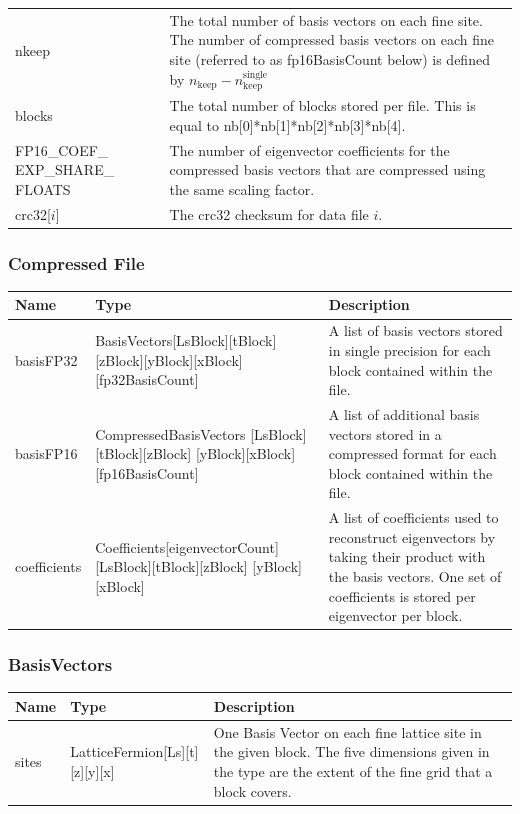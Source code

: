 \documentclass{article}
\begin{document}
\begin{longtable}{p{} |p{} |p{}}
nkeep & & The total number of basis vectors on each fine site. The number of compressed basis vectors on each fine site (referred to as fp16BasisCount below) is defined by $n_\mathrm{keep} - n_\mathrm{keep}^\mathrm{single}$\\
blocks & & The total number of blocks stored per file. This is equal to nb[0]*nb[1]*nb[2]*nb[3]*nb[4].\\
FP16\_COEF\_ EXP\_SHARE\_ FLOATS & & The number of eigenvector coefficients for the compressed basis vectors that are compressed using the same scaling factor.\\
crc32[$i$] & & The crc32 checksum for data file $i$.\\
\hline
\end{longtable}

\subsubsection{Compressed File}
\begin{tabular}{p{} |p{} |p{}}
\hline
Name & Type & Description\\
\hline
basisFP32 & BasisVectors[LsBlock][tBlock] [zBlock][yBlock][xBlock] [fp32BasisCount] & A list of basis vectors stored in single precision for each block contained within the file.\\
basisFP16 & CompressedBasisVectors [LsBlock][tBlock][zBlock] [yBlock][xBlock] [fp16BasisCount] & A list of additional basis vectors stored in a compressed format for each block contained within the file.\\
coefficients & Coefficients[eigenvectorCount]
[LsBlock][tBlock][zBlock] [yBlock][xBlock]  & A list of coefficients used to reconstruct eigenvectors by taking their product with the basis vectors. One set of coefficients is stored per eigenvector per block.\\
\hline
\end{tabular}

\subsubsection{BasisVectors}
\begin{tabular}{p{} |p{} |p{}}
\hline
Name & Type & Description\\
\hline
sites & LatticeFermion[Ls][t][z][y][x] & One Basis Vector on each fine lattice site in the given block. The five dimensions given in the type are the extent of the fine grid that a block covers.\\
\hline
\end{tabular}
\end{document}
